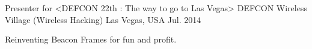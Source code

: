 

\begin{cventries}

  \cventry
    {Presenter for <DEFCON 22th : The way to go to Las Vegas>} %
    {DEFCON Wireless Village (Wireless Hacking)} %
    {Las Vegas, USA} %
    {Jul. 2014} %
    {
      \begin{cvitems} %
        \item {Reinventing Beacon Frames for fun and profit.}
      \end{cvitems}
    }

\end{cventries}

